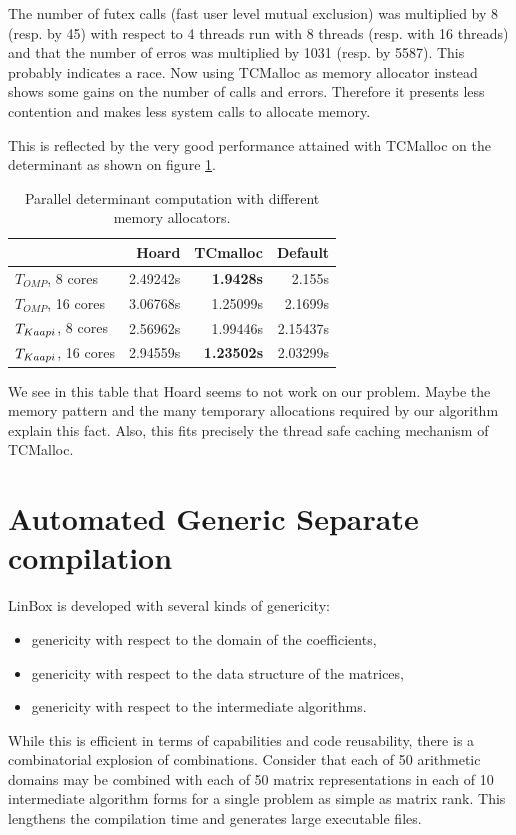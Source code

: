 \documentclass{article}
\newcommand{\linbox}{{\sc LinBox}\xspace}
\newcommand{\kaapi}{{\sc Kaapi}\xspace}
\begin{document}
The number of futex calls (fast user level mutual
  exclusion) was multiplied by 8 (resp. by 45) with respect to 4
  threads run with 8 threads (resp. with 16 threads) and that the
  number of erros was multiplied by 1031 (resp. by 5587).
  This probably indicates a race.
Now using TCMalloc as memory allocator instead shows some gains on the
number of calls and errors. Therefore it presents less contention
and makes less system calls to allocate memory.

This is reflected by the very good performance attained with TCMalloc
on the determinant as shown on figure \ref{tab:allocs}.

\begin{table}[htb]\center
\begin{tabular}{|l||r|r|r|}
\hline
& Hoard & TCmalloc & Default\\
\hline
$T_{OMP}$, 8 cores& 2.49242s&\bf 1.9428s& 2.155s\\
$T_{OMP}$, 16 cores& 3.06768s& 1.25099s& 2.1699s\\
\hline
$T_{\kaapi}$, 8 cores& 2.56962s& 1.99446s& 2.15437s\\
$T_{\kaapi}$, 16 cores& 2.94559s&\bf 1.23502s& 2.03299s\\
\hline
\end{tabular}\caption{Parallel determinant computation with different
  memory allocators.}\label{tab:allocs}
\end{table}

We see in this table that Hoard seems to not work on our problem.
Maybe the memory pattern and the many temporary allocations required by
our algorithm explain this fact. Also, this fits precisely the thread
safe caching mechanism of TCMalloc.

\section{Automated Generic Separate compilation}\label{sec:sepcomp}
\linbox is developed with several kinds of genericity:
\begin{itemize}
\item 
genericity with respect to the domain of the coefficients,
\item 
genericity with respect to the data structure of the matrices,
\item 
genericity with respect to the intermediate algorithms.
\end{itemize}
While this is efficient in terms of capabilities and code reusability, there is a combinatorial explosion of combinations.  Consider that each of 50 arithmetic domains may be combined with each of 50 matrix representations in each of 10 intermediate algorithm forms for a single problem as simple as matrix rank. This
lengthens the compilation time and generates large executable files.
\end{document}
